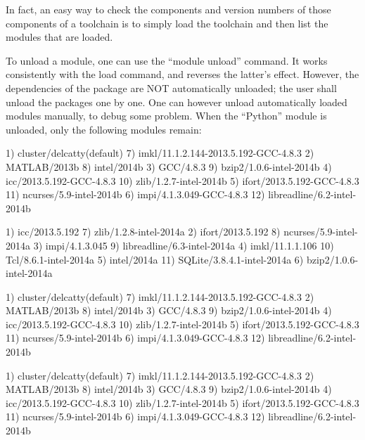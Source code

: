 In fact, an easy way to check the components and version numbers of those
components of a toolchain is to simply load the toolchain and then list the
modules that are loaded.

To unload a module, one can use the ``module unload'' command. It works
consistently with the load command, and reverses the latter's effect. However,
the dependencies of the package are NOT automatically unloaded; the user shall
unload the packages one by one. One can however unload automatically loaded
modules manually, to debug some problem. When the ``Python'' module is unloaded,
only the following modules remain:

\ifantwerpen
\begin{prompt}
  1) cluster/delcatty(default)              7) imkl/11.1.2.144-2013.5.192-GCC-4.8.3
  2) MATLAB/2013b                           8) intel/2014b
  3) GCC/4.8.3                              9) bzip2/1.0.6-intel-2014b
  4) icc/2013.5.192-GCC-4.8.3              10) zlib/1.2.7-intel-2014b
  5) ifort/2013.5.192-GCC-4.8.3            11) ncurses/5.9-intel-2014b
  6) impi/4.1.3.049-GCC-4.8.3              12) libreadline/6.2-intel-2014b
\end{prompt}
\fi
\ifleuven
\begin{prompt}
  1) icc/2013.5.192                7) zlib/1.2.8-intel-2014a
  2) ifort/2013.5.192              8) ncurses/5.9-intel-2014a
  3) impi/4.1.3.045                9) libreadline/6.3-intel-2014a
  4) imkl/11.1.1.106              10) Tcl/8.6.1-intel-2014a
  5) intel/2014a                  11) SQLite/3.8.4.1-intel-2014a
  6) bzip2/1.0.6-intel-2014a
\end{prompt}
\fi
\ifgent
\begin{prompt}
  1) cluster/delcatty(default)              7) imkl/11.1.2.144-2013.5.192-GCC-4.8.3
  2) MATLAB/2013b                           8) intel/2014b
  3) GCC/4.8.3                              9) bzip2/1.0.6-intel-2014b
  4) icc/2013.5.192-GCC-4.8.3              10) zlib/1.2.7-intel-2014b
  5) ifort/2013.5.192-GCC-4.8.3            11) ncurses/5.9-intel-2014b
  6) impi/4.1.3.049-GCC-4.8.3              12) libreadline/6.2-intel-2014b
\end{prompt}
\fi
\ifbrussel
\begin{prompt}
  1) cluster/delcatty(default)              7) imkl/11.1.2.144-2013.5.192-GCC-4.8.3
  2) MATLAB/2013b                           8) intel/2014b
  3) GCC/4.8.3                              9) bzip2/1.0.6-intel-2014b
  4) icc/2013.5.192-GCC-4.8.3              10) zlib/1.2.7-intel-2014b
  5) ifort/2013.5.192-GCC-4.8.3            11) ncurses/5.9-intel-2014b
  6) impi/4.1.3.049-GCC-4.8.3              12) libreadline/6.2-intel-2014b
\end{prompt}
\fi



